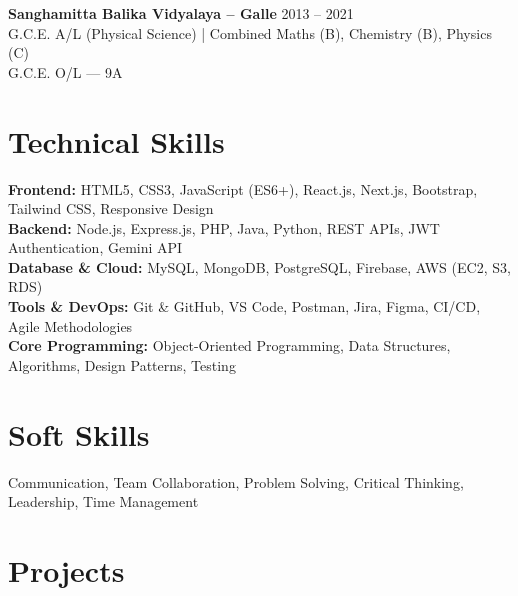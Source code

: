 \documentclass[letterpaper,10.8pt]{article}
\newenvironment{resume_list}{
  \vspace{-1pt}
  \begin{itemize}[itemsep=2pt, leftmargin=14pt]
}{
  \end{itemize}\vspace{-2pt}
}
\begin{document}
\vspace{2pt}
\noindent\textbf{Sanghamitta Balika Vidyalaya – Galle} \hfill 2013 – 2021\\
\noindent G.C.E. A/L (Physical Science) | Combined Maths (B), Chemistry (B), Physics (C)\\
\noindent G.C.E. O/L — 9A

\section{Technical Skills}
\vspace{-1pt}

\textbf{Frontend:} HTML5, CSS3, JavaScript (ES6+), React.js, Next.js, Bootstrap, Tailwind CSS, Responsive Design\\[4pt]
\textbf{Backend:} Node.js, Express.js, PHP, Java, Python, REST APIs, JWT Authentication, Gemini API\\[4pt]
\textbf{Database \& Cloud:} MySQL, MongoDB, PostgreSQL, Firebase, AWS (EC2, S3, RDS)\\[4pt]
\textbf{Tools \& DevOps:} Git \& GitHub, VS Code, Postman, Jira, Figma, CI/CD, Agile Methodologies\\[4pt]
\textbf{Core Programming:} Object-Oriented Programming, Data Structures, Algorithms, Design Patterns, Testing

\section{Soft Skills}
\vspace{-1pt}
Communication, Team Collaboration, Problem Solving, Critical Thinking, Leadership, Time Management

\section{Projects}
\vspace{-2pt}

\newcommand{\project}[5]{%
  \noindent
  \makebox[0pt][l]{\faGithub}%
  \hspace{1.5em}\textbf{\href{#1}{#2}} \hfill #3\\[-1pt]
  \textit{#4}\\[-5pt]
  \begin{resume_list}
    #5
  \end{resume_list}
  \vspace{4pt}
}
\end{document}
